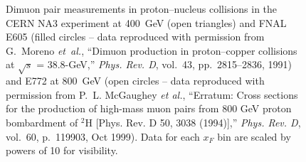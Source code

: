 \documentclass[a4paper,10pt]{article}
\begin{document}
\begin{figure}[p]
%
\caption{Dimuon pair measurements in proton--nucleus collisions in the CERN
NA3 experiment at 400~GeV (open triangles) and
FNAL E605 (filled circles -- data reproduced with permission from
G.~Moreno {\em et~al.}, ``{Dimuon production in proton--copper collisions at
  $\sqrt{s}$ = 38.8-GeV},'' {\em Phys. Rev. D}, vol.~43, pp.~2815--2836, 1991)
and E772 at 800~GeV (open circles -- data reproduced with permission from
P.~L. McGaughey {\it et al.}, ``Erratum: Cross sections
  for the production of high-mass muon pairs from 800 GeV proton bombardment of
  ${}^{2}\mathrm{H}$ [Phys. Rev. D 50, 3038 (1994)],'' {\em Phys. Rev. D},
  vol.~60, p.~119903, Oct 1999).
Data for each $x_F$ bin are scaled by powers of 10 for visibility.
}
\end{figure}
%
%
\end{document}
